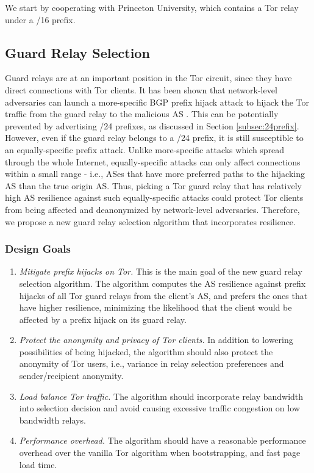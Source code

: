 We start by cooperating with Princeton University, which contains a Tor relay under a /16 prefix. 

\subsection{Guard Relay Selection}
\label{subsec:relayselection}

Guard relays are at an important position in the Tor circuit, since they have direct connections with Tor clients. It has been shown that network-level adversaries can launch a more-specific BGP prefix hijack attack to hijack the Tor traffic from the guard relay to the malicious AS \cite{sun2015raptor}. This can be potentially prevented by advertising /24 prefixes, as discussed in Section \ref{subsec:24prefix}. However, even if the guard relay belongs to a /24 prefix, it is still susceptible to an equally-specific prefix attack. Unlike more-specific attacks which spread through the whole Internet, equally-specific attacks can only affect connections within a small range - i.e., ASes that have more preferred paths to the hijacking AS than the true origin AS. Thus, picking a Tor guard relay that has relatively high AS resilience against such equally-specific attacks could protect Tor clients from being affected and deanonymized by network-level adversaries. Therefore, we propose a new guard relay selection algorithm that incorporates resilience.

\subsubsection{Design Goals}
\begin{enumerate}
\item \emph{Mitigate prefix hijacks on Tor.} This is the main goal of the new guard relay selection algorithm. The algorithm computes the AS resilience against prefix hijacks of all Tor guard relays from the client's AS, and prefers the ones that have higher resilience, minimizing the likelihood that the client would be affected by a prefix hijack on its guard relay. 
\item \emph{Protect the anonymity and privacy of Tor clients.} In addition to lowering possibilities of being hijacked, the algorithm should also protect the anonymity of Tor users, i.e., variance in relay selection preferences and sender/recipient anonymity. 
\item \emph{Load balance Tor traffic.} The algorithm should incorporate relay bandwidth into selection decision and avoid causing excessive traffic congestion on low bandwidth relays. 
\item \emph{Performance overhead.} The algorithm should have a reasonable performance overhead over the vanilla Tor algorithm when bootstrapping, and fast page load time. 
\end{enumerate}

